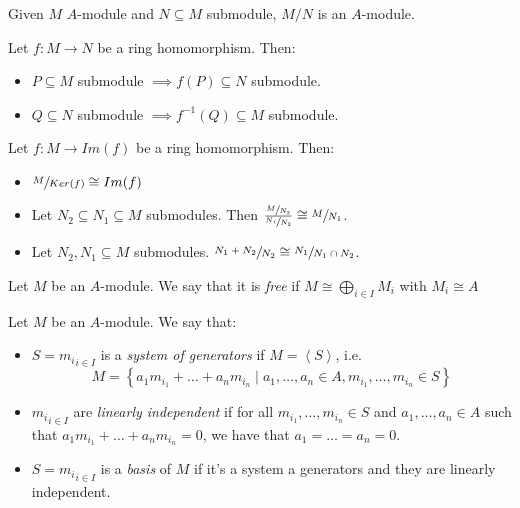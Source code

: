         \begin{prop}
            Given $M$ $A$-module and $N \subseteq M$ submodule, $M/N$ is an $A$-module.
        \end{prop}

        \begin{prop}
            Let $f: M \longrightarrow N$ be a ring homomorphism.
            Then:
            \begin{itemize}
                \item $P \subseteq M$ submodule $\implies f(P) \subseteq N$ submodule.
                \item $Q \subseteq N$ submodule $\implies f^{-1}(Q) \subseteq M$ submodule.
            \end{itemize}
        \end{prop}

        \begin{rk}
            Let $f: M \longrightarrow Im(f)$ be a ring homomorphism.
            Then:
            \begin{itemize}
                \item $\sfrac{M}{Ker(f)} \cong Im(f)$
                \item Let $N_2 \subseteq N_1 \subseteq M$ submodules.
                Then $\frac{\sfrac{M}{N_2}}{\sfrac{N_1}{N_2}} \cong \sfrac{M}{N_1}$.
                \item Let $N_2, N_1 \subseteq M$ submodules.
                $\sfrac{N_1 + N_2}{N_2} \cong \sfrac{N_1}{N_1 \cap N_2}$.
            \end{itemize}
        \end{rk}

        \begin{defn}
            Let $M$ be an $A$-module.
            We say that it is \emph{free} if $M \cong \bigoplus_{i \in I} M_i$ with $M_i \cong A$
        \end{defn}

        \begin{defn}
            Let $M$ be an $A$-module.
            We say that:
            \begin{itemize}
                \item $S = {m_i}_{i \in I}$ is a \emph{system of generators} if $M = \left<S\right> $, i.e.
                \[
                    M = \left\{ a_1 m_{i_1} + \dots + a_n m_{i_n} \mid a_1, \dots, a_n \in A, m_{i_1}, \dots, m_{i_n} \in S \right\}
                \]
                \item ${m_i}_{i \in I}$ are \emph{linearly independent} if for all $m_{i_1}, \dots, m_{i_n} \in S$ and $a_1, \dots, a_n \in A$
                such that $a_1 m_{i_1} + \dots + a_n m_{i_n} = 0$, we have that $a_1 = \dots = a_n = 0$.
                \item $S = {m_i}_{i \in I}$ is a \emph{basis} of $M$ if it's a system a generators and they are linearly independent.
            \end{itemize}
        \end{defn}

